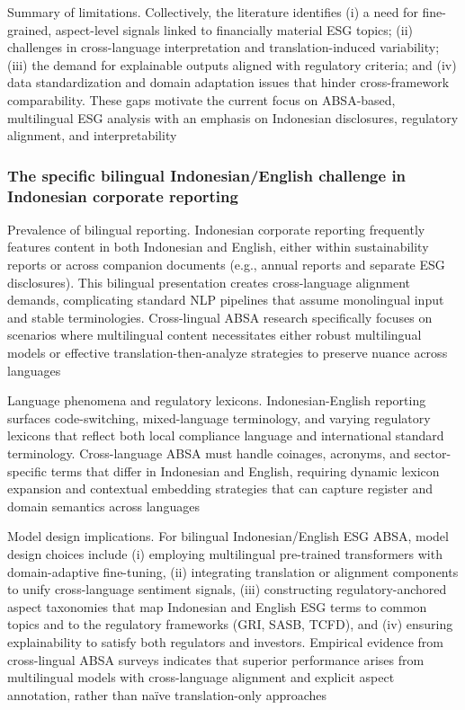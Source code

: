 Summary of limitations. Collectively, the literature identifies (i) a need for fine-grained, aspect-level signals linked to financially material ESG topics; (ii) challenges in cross-language interpretation and translation-induced variability; (iii) the demand for explainable outputs aligned with regulatory criteria; and (iv) data standardization and domain adaptation issues that hinder cross-framework comparability. These gaps motivate the current focus on ABSA-based, multilingual ESG analysis with an emphasis on Indonesian disclosures, regulatory alignment, and interpretability \cite{10.1002/csr.70089,10.2139/ssrn.3738629,10.1108/mf-01-2023-0020,10.1016/j.inffus.2025.103073,10.1111/eufm.12509,10.48550/arxiv.2511.00024,10.3390/math12193119}

\subsubsection{The specific bilingual Indonesian/English challenge in Indonesian corporate reporting}
Prevalence of bilingual reporting. Indonesian corporate reporting frequently features content in both Indonesian and English, either within sustainability reports or across companion documents (e.g., annual reports and separate ESG disclosures). This bilingual presentation creates cross-language alignment demands, complicating standard NLP pipelines that assume monolingual input and stable terminologies. Cross-lingual ABSA research specifically focuses on scenarios where multilingual content necessitates either robust multilingual models or effective translation-then-analyze strategies to preserve nuance across languages \cite{10.1016/j.inffus.2025.103073,10.1111/eufm.12509,10.48550/arxiv.2511.00024}

Language phenomena and regulatory lexicons. Indonesian-English reporting surfaces code-switching, mixed-language terminology, and varying regulatory lexicons that reflect both local compliance language and international standard terminology. Cross-language ABSA must handle coinages, acronyms, and sector-specific terms that differ in Indonesian and English, requiring dynamic lexicon expansion and contextual embedding strategies that can capture register and domain semantics across languages \cite{10.1016/j.inffus.2025.103073,10.1111/eufm.12509,10.48550/arxiv.2511.00024}

Model design implications. For bilingual Indonesian/English ESG ABSA, model design choices include (i) employing multilingual pre-trained transformers with domain-adaptive fine-tuning, (ii) integrating translation or alignment components to unify cross-language sentiment signals, (iii) constructing regulatory-anchored aspect taxonomies that map Indonesian and English ESG terms to common topics and to the regulatory frameworks (GRI, SASB, TCFD), and (iv) ensuring explainability to satisfy both regulators and investors. Empirical evidence from cross-lingual ABSA surveys indicates that superior performance arises from multilingual models with cross-language alignment and explicit aspect annotation, rather than naïve translation-only approaches \cite{10.1016/j.inffus.2025.103073,10.1111/eufm.12509,10.48550/arxiv.2511.00024,10.3390/math12193119}

